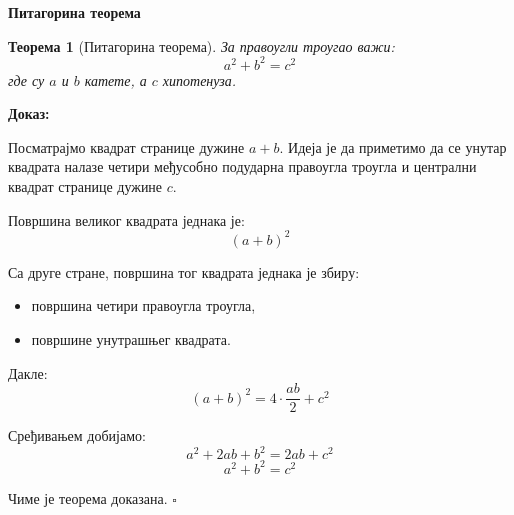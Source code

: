 \documentclass[11pt,a4paper]{article}
\newtheorem{theorem}{Теорема}
\begin{document}
\begin{center}
{\LARGE \textbf{Питагорина теорема}}
\end{center}

\begin{theoremBox}
\begin{theorem}[Питагорина теорема]
\label{thm:pitagora}
За правоугли троугао важи:
\[
a^2 + b^2 = c^2
\]
где су $a$ и $b$ катете, а $c$ хипотенуза.
\end{theorem}
\end{theoremBox}

\textbf{Доказ:}

Посматрајмо квадрат странице дужине $a+b$. Идеја је да приметимо да се унутар квадрата налазе четири међусобно подударна правоугла троугла и централни квадрат странице дужине $c$.
\begin{center} 
\end{center} 

Површина великог квадрата једнака је: \[ (a+b)^2 \] 

Са друге стране, површина тог квадрата једнака је збиру:

\begin{itemize} 
\item површина четири правоугла троугла,
\item површине унутрашњег квадрата. 
\end{itemize} 

Дакле:
\[ (a+b)^2=4\cdot \frac{ab}{2}+c^2 \]

Сређивањем добијамо: \[ a^2+2ab+b^2=2ab+c^2 \] 
\[ a^2+b^2=c^2 \]

Чиме је теорема доказана. \hfill $\square$

\vspace{0.5cm}
\end{document}
